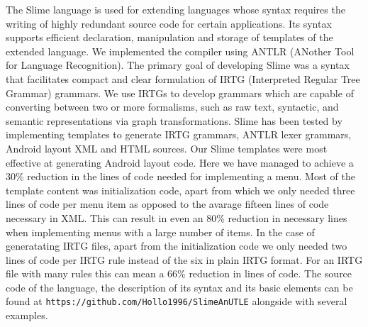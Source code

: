 The Slime language is used for extending languages whose syntax requires the writing of highly redundant source code for certain applications. 
Its syntax supports efficient declaration, manipulation and storage of templates of the extended language. 
We implemented the compiler using ANTLR (ANother Tool for Language Recognition). 
The primary goal of developing Slime was a syntax that facilitates compact and clear formulation of IRTG (Interpreted Regular Tree Grammar) grammars. 
We use IRTGs to develop grammars which are capable of converting between two or more formalisms, such as raw text, syntactic, and semantic representations via graph transformations. 
Slime has been tested by implementing templates to generate IRTG grammars, ANTLR lexer grammars, Android layout XML and HTML sources.
Our Slime templates were most effective at generating Android layout code. Here we have managed to achieve a 30\% reduction in the lines of code needed
for implementing a menu. Most of the template content was initialization code, apart from which we only needed three lines of code per menu item as opposed to the avarage fifteen lines of code necessary in XML. This can result in even an 80\% reduction in necessary lines when implementing menus with a large number of items. In the case of generatating IRTG files, apart from the initialization code we only needed two lines of code per IRTG rule instead of the six in plain IRTG format. For an IRTG file with many rules this can mean a 66\% reduction in lines of code.
The source code of the language, the description of its syntax and its basic elements can be found at \texttt{https://github.com/Hollo1996/SlimeAnUTLE} alongside with several examples.

\vfill
\selectthesislanguage

\setcounter{romanPage}{\value{page}}
